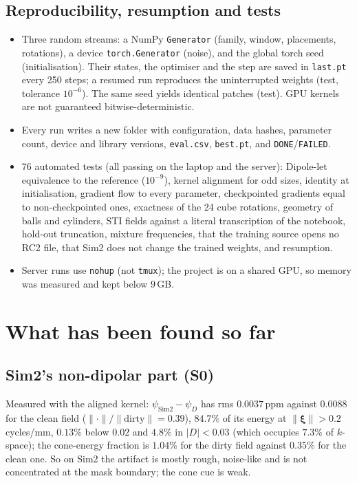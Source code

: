 \documentclass[11pt]{article}
\newcommand{\bxi}{\bm{\xi}}
\newcommand{\norm}[1]{\lVert #1\rVert}
\newcommand{\abs}[1]{\lvert #1\rvert}
\newcommand{\code}[1]{\texttt{#1}}
\theoremstyle{remark}
\begin{document}
\subsection{Reproducibility, resumption and tests}
\begin{itemize}[leftmargin=1.5em,itemsep=1pt]
\item Three random streams: a NumPy \code{Generator} (family, window, placements, rotations), a device \code{torch.Generator} (noise), and the global torch seed (initialisation). Their states, the optimiser and the step are saved in \code{last.pt} every 250 steps; a resumed run reproduces the uninterrupted weights (test, tolerance $10^{-6}$). The same seed yields identical patches (test). GPU kernels are not guaranteed bitwise-deterministic.
\item Every run writes a new folder with configuration, data hashes, parameter count, device and library versions, \code{eval.csv}, \code{best.pt}, and \code{DONE}/\code{FAILED}.
\item 76 automated tests (all passing on the laptop and the server): Dipole-let equivalence to the reference ($10^{-9}$), kernel alignment for odd sizes, identity at initialisation, gradient flow to every parameter, checkpointed gradients equal to non-checkpointed ones,
exactness of the 24 cube rotations, geometry of balls and cylinders, STI fields against a literal transcription of the notebook, hold-out truncation, mixture frequencies, that the training source opens no RC2 file, that Sim2 does not change the trained weights, and resumption.
\item Server runs use \code{nohup} (not \code{tmux}); the project is on a shared GPU, so memory was measured and kept below $9$\,GB.
\end{itemize}

\section{What has been found so far}\label{sec:results}

\subsection{Sim2's non-dipolar part (S0)}
Measured with the aligned kernel: $\psi_{\mathrm{Sim2}}-\psi_D$ has rms $0.0037$\,ppm against $0.0088$ for the clean field ($\norm{\cdot}/\norm{\text{dirty}}=0.39$), $84.7\%$ of its energy at $\norm\bxi>0.2$ cycles/mm, $0.13\%$ below $0.02$ and $4.8\%$ in $\abs D<0.03$ (which occupies $7.3\%$ of $k$-space); the cone-energy fraction is $1.04\%$ for the dirty field against $0.35\%$ for the clean one.
So on Sim2 the artifact is mostly rough, noise-like and is not concentrated at the mask boundary; the cone cue is weak.
\end{document}
